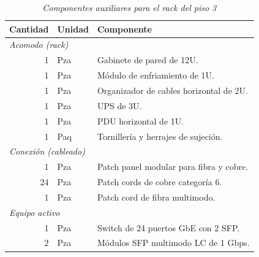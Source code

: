 \begin{table}[H]
  \caption{\textit{Componentes auxiliares para el rack del piso 3}}
  \label{tab:bom_piso3}
  \centering
  \begin{tabularx}{\textwidth}{r l X}
    	\toprule
    	\textbf{Cantidad} & \textbf{Unidad} & \textbf{Componente} \\
    \midrule
    \multicolumn{3}{l}{\textit{Acomodo (rack)}} \\
    1 & Pza & Gabinete de pared de 12U. \\
    1 & Pza & Módulo de enfriamiento de 1U. \\
    1 & Pza & Organizador de cables horizontal de 2U. \\
    1 & Pza & UPS de 3U. \\
    1 & Pza & PDU horizontal de 1U. \\
    1 & Paq & Tornillería y herrajes de sujeción. \\
    \multicolumn{3}{l}{\textit{Conexión (cableado)}} \\
    1 & Pza & Patch panel modular para fibra y cobre. \\
    24 & Pza & Patch cords de cobre categoría 6. \\
    1 & Pza & Patch cord de fibra multimodo. \\
    \multicolumn{3}{l}{\textit{Equipo activo}} \\
    1 & Pza & Switch de 24 puertos GbE con 2 SFP. \\
    2 & Pza & Módulos SFP multimodo LC de 1 Gbps. \\
    \bottomrule
  \end{tabularx}
\end{table}
